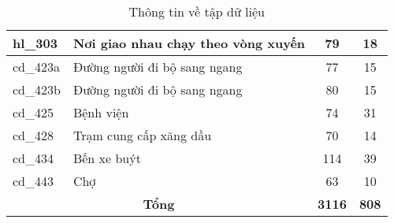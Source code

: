 \documentclass[../thesis.tex]{subfiles}
\begin{document}
\begin{table}[!htb]
\begin{longtable}{| l | l | c | c |}
	\hline
	hl\_303 & Nơi giao nhau chạy theo vòng xuyến & 79 & 18\\
	\hline
	cd\_423a & Đường người đi bộ sang ngang & 77 & 15\\
	\hline
	cd\_423b & Đường người đi bộ sang ngang & 80 & 15\\
	\hline
	cd\_425 & Bệnh viện & 74 & 31\\
	\hline
	cd\_428 & Trạm cung cấp xăng dầu & 70 & 14\\
	\hline
	cd\_434 & Bến xe buýt & 114 & 39\\
	\hline
	cd\_443 & Chợ & 63 & 10\\
	\hline
	\multicolumn{2}{|c|}{\textbf{Tổng}} & \textbf{3116} & \textbf{808}\\
	\hline
\end{longtable}
\caption{Thông tin về tập dữ liệu}
\label{Table:datset}
\end{table}
\end{document}
